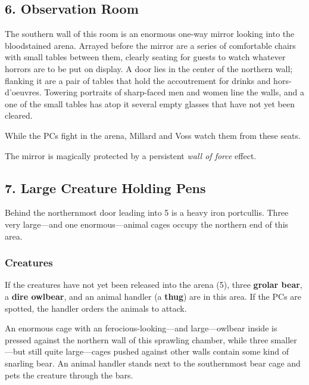 \documentclass[10pt,a4paper,twoside,bg=print,twocolumn,openany,nodeprecatedcode]{dndbook}
\begin{document}
\subsection{6. Observation Room}
\begin{DndReadAloud}{}
The southern wall of this room is an enormous one-way mirror looking into the bloodstained arena. Arrayed before the mirror are a series of comfortable chairs with small tables between them, clearly seating for guests to watch whatever horrors are to be put on display. A door lies in the center of the northern wall; flanking it are a pair of tables that hold the accoutrement for drinks and hors-d'oeuvres. Towering portraits of sharp-faced men and women line the walls, and a one of the small tables has atop it several empty glasses that have not yet been cleared.

\end{DndReadAloud}

While the PCs fight in the arena, Millard and Voss watch them from these seats.

The mirror is magically protected by a persistent \textit{wall of force} effect.

\subsection{7. Large Creature Holding Pens}
Behind the northernmost door leading into 5 is a heavy iron portcullis. Three very large—and one enormous—animal cages occupy the northern end of this area.

\subsubsection{Creatures}
If the creatures have not yet been released into the arena (5), three \textbf{grolar bear}, a \textbf{dire owlbear}, and an animal handler (a \textbf{thug}) are in this area. If the PCs are spotted, the handler orders the animals to attack.

\begin{DndReadAloud}{}
An enormous cage with an ferocious-looking—and large—owlbear inside is pressed against the northern wall of this sprawling chamber, while three smaller—but still quite large—cages pushed against other walls contain some kind of snarling bear. An animal handler stands next to the southernmost bear cage and pets the creature through the bars.

\end{DndReadAloud}
\end{document}
